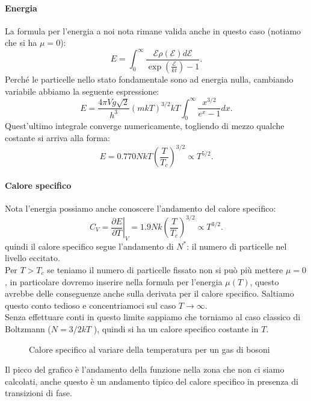 \paragraph{Energia}
La formula per l'energia a noi nota rimane valida anche in questo caso (notiamo che si ha $\mu=0$):
\[
	E = \int_{0}^{\infty} 
	\frac{\mathcal{E} \rho ( \mathcal{E} ) d\mathcal{E} }
	{\exp\left( \frac{\mathcal{E} }{kt} \right) -1} 
.\] 
Perché le particelle nello stato fondamentale sono ad energia nulla, cambiando variabile abbiamo la seguente espressione:
\[
	E = \frac{4\pi V g \sqrt{2} }
	{h^3}\left( m k T \right) ^{3 /2} kT 
	\int_{0}^{\infty} \frac{x^{3 /2}}{e^{x}-1}dx  
.\] 
Quest'ultimo integrale converge numericamente, togliendo di mezzo qualche costante si arriva alla forma:
\[
	E = 0.770 NkT \left( \frac{T}{T_{c}} \right) ^{3 /2} \propto T^{5 /2}
.\] 
\paragraph{Calore specifico}
Nota l'energia possiamo anche conoscere l'andamento del calore specifico:
\[
	C_{V}= \left.\frac{\partial E}{\partial T} \right|_{V} = 1.9 Nk \left( \frac{T}{T_{c}} \right) ^{3 /2} \propto T^{3 /2}
.\] 
quindi il calore specifico segue l'andamento di $N^{*}$: il numero di particelle nel livello eccitato. \\
Per $T > T_{c}$ se teniamo il numero di particelle fissato non si può più mettere $\mu = 0$, in particolare dovremo inserire nella formula per l'energia $\mu(T)$, questo avrebbe delle conseguenze anche sulla derivata per il calore specifico. Saltiamo questo conto tedioso e concentriamoci sul caso $T\to \infty$.\\
Senza effettuare conti in questo limite sappiamo che torniamo al caso classico di Boltzmann ($N= 3/2 kT$ ), quindi si ha un calore specifico costante in $T$.
\begin{figure}[H]
    \centering
    \caption{Calore specifico al variare della temperatura per un gas di bosoni}
    \label{fig:calore-specifico-al-variare-della-temperatura-per-un-gas-di-bosoni}
\end{figure}
\noindent
Il picco del grafico è l'andamento della funzione nella zona che non ci siamo calcolati, anche questo è un andamento tipico del calore specifico in presenza di transizioni di fase.\\
